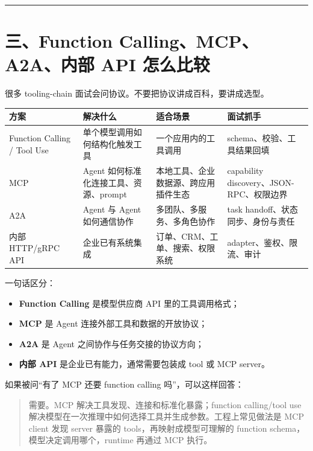 \bigskip\hrule\bigskip

\section{三、Function Calling、MCP、A2A、内部 API 怎么比较}

很多 tooling-chain 面试会问协议。不要把协议讲成百科，要讲成选型。


\begingroup
\scriptsize
\setlength{\tabcolsep}{3pt}
\begin{longtable}{|p{}|p{}|p{}|p{}|}
\hline
方案 & 解决什么 & 适合场景 & 面试抓手 \\ \hline
Function Calling / Tool Use & 单个模型调用如何结构化触发工具 & 一个应用内的工具调用 & schema、校验、工具结果回填 \\ \hline
MCP & Agent 如何标准化连接工具、资源、prompt & 本地工具、企业数据源、跨应用插件生态 & capability discovery、JSON-RPC、权限边界 \\ \hline
A2A & Agent 与 Agent 如何通信协作 & 多团队、多服务、多角色协作 & task handoff、状态同步、身份与责任 \\ \hline
内部 HTTP/gRPC API & 企业已有系统集成 & 订单、CRM、工单、搜索、权限系统 & adapter、鉴权、限流、审计 \\ \hline
\end{longtable}
\endgroup

一句话区分：


\begin{itemize}[leftmargin=2em]
\item \textbf{Function Calling} 是模型供应商 API 里的工具调用格式；
\item \textbf{MCP} 是 Agent 连接外部工具和数据的开放协议；
\item \textbf{A2A} 是 Agent 之间协作与任务交接的协议方向；
\item \textbf{内部 API} 是企业已有能力，通常需要包装成 tool 或 MCP server。
\end{itemize}

如果被问``有了 MCP 还要 function calling 吗''，可以这样回答：


\begin{quote}
需要。MCP 解决工具发现、连接和标准化暴露；function calling/tool use 解决模型在一次推理中如何选择工具并生成参数。工程上常见做法是 MCP client 发现 server 暴露的 tools，再映射成模型可理解的 function schema，模型决定调用哪个，runtime 再通过 MCP 执行。\\
\end{quote}

